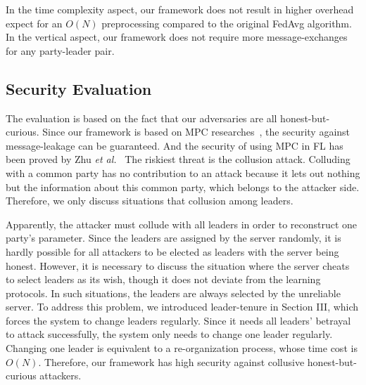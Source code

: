 In the time complexity aspect, our framework does not result in higher overhead expect for an $O(N)$ preprocessing compared to the original FedAvg algorithm. In the vertical aspect, our framework does not require more message-exchanges for any party-leader pair. 

\subsection{Security Evaluation}
The evaluation is based on the fact that our adversaries are all honest-but-curious. Since our framework is based on MPC researches~\cite{Shamir,Du2001SecureMC,Three-Party}, the security against message-leakage can be guaranteed. And the security of using MPC in FL has been proved by Zhu \emph{et al.}~\cite{Weighted} The riskiest threat is the collusion attack. Colluding with a common party has no contribution to an attack because it lets out nothing but the information about this common party, which belongs to the attacker side. Therefore, we only discuss situations that collusion among leaders. 

Apparently, the attacker must collude with all leaders in order to reconstruct one party's parameter. Since the leaders are assigned by the server randomly, it is hardly possible for all attackers to be elected as leaders with the server being honest. However, it is necessary to discuss the situation where the server cheats to select leaders as its wish, though it does not deviate from the learning protocols. In such situations, the leaders are always selected by the unreliable server. To address this problem, we introduced leader-tenure in Section III, which forces the system to change leaders regularly. Since it needs all leaders' betrayal to attack successfully, the system only needs to change one leader regularly. Changing one leader is equivalent to a re-organization process, whose time cost is $O(N)$. Therefore, our framework has high security against collusive honest-but-curious attackers.
